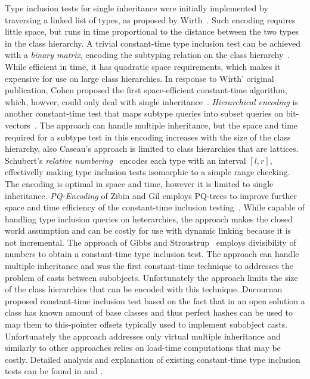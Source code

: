 Type inclusion tests for single inheritance were initially implemented by 
traversing a linked list of types, as proposed by Wirth~\cite{Wirth88}. Such 
encoding requires little space, but runs in time proportional to the distance 
between the two types in the class hierarchy. A trivial constant-time type 
inclusion test can be achieved with a \emph{binary matrix}, encoding the 
subtyping relation on the class hierarchy~\cite{Vortex96}. While efficient in 
time, it has quadratic space requirements, which makes it expensive for use on 
large class hierarchies. In response to Wirth' original publication, Cohen 
proposed the first space-efficient constant-time algorithm, which, howver, could 
only deal with single inheritance~\cite{Cohen91}. \emph{Hierarchical encoding} 
is another constant-time test that maps subtype queries into subset queries on 
bit-vectors~\cite{Caseau93,Krall97nearoptimal}. The approach can handle multiple
inheritance, but the space and time required for a subtype test in this encoding 
increases with the size of the class hierarchy, also Caseau's approach is 
limited to class hierarchies that are lattices. Schubert's \emph{relative 
numbering}~\cite{Schubert83} encodes each type with an interval $[l,r]$, 
effectivelly making type inclusion tests isomorphic to a simple range checking. 
The encoding is optimal in space and time, however it is limited to single 
inheritance. \emph{PQ-Encoding} of Zibin and Gil employs PQ-trees to improve 
further space and time efficiency of the constant-time inclusion 
testing~\cite{PQEncoding}. While capable of handling type inclusion queries on 
heterarchies, the approach makes the closed world assumption and can be costly 
for use with dynamic linking because it is not incremental.
The approach of Gibbs and Stroustrup~\cite{FastDynCast} employs divisibility of 
numbers to obtain a constant-time type inclusion test. The approach can handle 
multiple inheritance and was the first constant-time technique to addresses the 
problem of casts between subobjects. Unfortunately the approach limits the size 
of the class hierarchies that can be encoded with this technique. 
Ducournau proposed constant-time inclusion test based on the fact that in an 
open solution a class has known amount of base classes and thus perfect hashes 
can be used to map them to this-pointer offsets typically used to implement 
subobject casts\cite{Ducournau08}. Unfortunately the approach addresses only 
virtual multiple inheritance and similarly to other approaches relies on 
load-time computations that may be costly. Detailed analysis and explanation of 
existing constant-time type inclusion tests can be found in \cite{Vitek97} and 
\cite{PQEncoding}.

